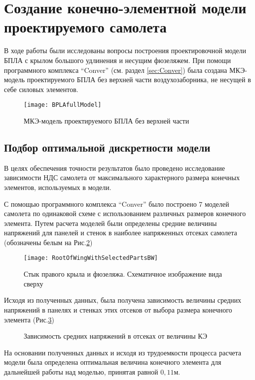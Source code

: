 \section{Создание конечно-элементной модели проектируемого самолета}

В ходе работы были исследованы вопросы построения проектировочной модели БПЛА с крылом большого удлинения и несущим фюзеляжем. При помощи программного комплекса ``Conver'' (см. раздел \ref{sec:Conver}) была создана МКЭ-модель проектируемого БПЛА без верхней части воздухозаборника, не несущей в себе силовых элементов. 

\begin{figure}[ht]
\centering
\texttt{[image: BPLAfullModel]}
\caption{МКЭ-модель проектируемого БПЛА без верхней части}
\label{fig:BPLAfullModel}
\end{figure}

\subsection{Подбор оптимальной дискретности модели}

В целях обеспечения точности результатов было проведено исследование зависимости НДС самолета от максимального характерного размера конечных элементов, используемых в модели. 

С помощью программного комплекса ``Conver'' было построено 7 моделей самолета по одинаковой схеме с использованием различных размеров конечного элемента. Путем расчета моделей были определены средние величины напряжений для панелей и стенок в наиболее напряженных отсеках самолета (обозначены белым на  Рис.\ref{fig:WingRootPlain})

\begin{figure}[ht]
\centering
\texttt{[image: RootOfWingWithSelectedPartsBW]}
\caption{Стык правого крыла и фюзеляжа. Схематичное изображение вида сверху}
\label{fig:WingRootPlain}
\end{figure}




Исходя из полученных данных, была получена зависимость величины средних напряжений в панелях и стенках этих отсеков от выбора размера конечного элемента (Рис.\ref{fig:stressToDiscreteness})

\begin{figure}[ht]
\centering

\caption{Зависимость средних напряжений в отсеках от величины КЭ}
\label{fig:stressToDiscreteness}
\end{figure}

На основании полученных данных и исходя из трудоемкости процесса расчета модели была определена оптимальная величина конечного элемента для дальнейшей работы над моделью, принятая равной $0,11\text{м}$. 
